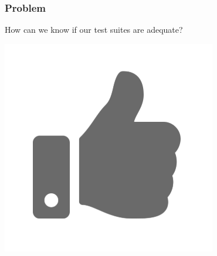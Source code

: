 \begin{frame}
	\frametitle{Problem}
	\begin{center}
		\huge{How can we know if our test suites are adequate?}

		\includegraphics[scale = .25]{images/thumb}
	\end{center}
\end{frame}

